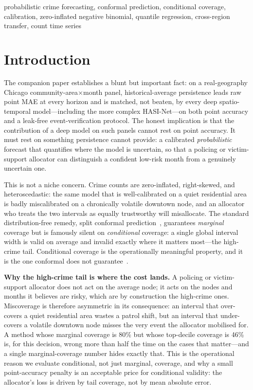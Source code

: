 \documentclass[11pt,conference]{IEEEtran}
\begin{document}
\begin{IEEEkeywords}
probabilistic crime forecasting, conformal prediction, conditional
coverage, calibration, zero-inflated negative binomial, quantile regression,
cross-region transfer, count time series
\end{IEEEkeywords}

\section{Introduction}\label{sec:intro}
The companion paper establishes a blunt but important fact: on a
real-geography Chicago community-area$\times$month panel, historical-average
persistence leads raw point MAE at every horizon and is matched, not beaten, by
every deep spatio-temporal model---including the more complex HASI-Net---on both
point accuracy and a leak-free event-verification protocol. The honest
implication is that the contribution of a deep model on such panels cannot rest
on point accuracy. It must rest on something persistence cannot provide: a
calibrated \emph{probabilistic} forecast that quantifies where the model is
uncertain, so that a policing or victim-support allocator can distinguish a
confident low-risk month from a genuinely uncertain one.

This is not a niche concern. Crime counts are zero-inflated, right-skewed, and
heteroscedastic: the same model that is well-calibrated on a quiet residential
area is badly miscalibrated on a chronically volatile downtown node, and an
allocator who treats the two intervals as equally trustworthy will misallocate.
The standard distribution-free remedy, split conformal
prediction~\cite{shafer2008tutorial,lei2018distribution,angelopoulos2022gentle},
guarantees \emph{marginal} coverage but is famously silent on \emph{conditional}
coverage: a single global interval width is valid on average and invalid exactly
where it matters most---the high-crime tail. Conditional coverage is the
operationally meaningful property, and it is the one conformal does not
guarantee~\cite{romano2019cqr,gneiting2007calibration}.

\textbf{Why the high-crime tail is where the cost lands.} A policing or
victim-support allocator does not act on the average node; it acts on the nodes
and months it believes are risky, which are by construction the high-crime ones.
Miscoverage is therefore asymmetric in its consequence: an interval that
over-covers a quiet residential area wastes a patrol shift, but an interval that
under-covers a volatile downtown node misses the very event the allocator
mobilised for. A method whose marginal coverage is 80\% but whose top-decile
coverage is 46\% is, for this decision, wrong more than half the time on the
cases that matter---and a single marginal-coverage number hides exactly that.
This is the operational reason we evaluate conditional, not just marginal,
coverage, and why a small point-accuracy penalty is an acceptable price for
conditional validity: the allocator's loss is driven by tail coverage, not by
mean absolute error.
\end{document}
